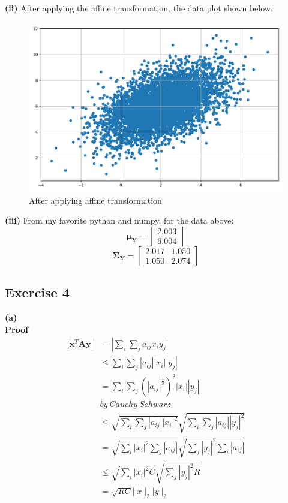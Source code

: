 \documentclass[11pt]{article}
\begin{document}
\textbf{(ii)} After applying the affine transformation, the data plot shown below.
\begin{figure}[h]
\centering
\includegraphics[width=0.45\linewidth]{exercise3_c2}
\caption{After applying affine transformation}
\label{fig: figure 3.3}
\end{figure}

\textbf{(iii)} From my favorite python and numpy, for the data above:
$$\pmb{\mu}_\textbf{Y}=\begin{bmatrix}
2.003\\
6.004
\end{bmatrix}$$
$$\pmb{\Sigma}_\textbf{Y}=\begin{bmatrix}
2.017& 1.050\\
1.050& 2.074
\end{bmatrix}$$
\pagebreak
\subsection*{Exercise 4}
\noindent\textbf{(a)}\\
\textbf{Proof}
\begin{equation} \label{4.a}
\begin{split}
\left|\textbf{x}^T\textbf{Ay}\right|&=\left|\sum_{i}\sum_{j}a_{ij}x_iy_j\right|\\
&\le\sum_i\sum_j\left|a_{ij}\right|\left|x_i\right|\left|y_j\right|\\
&=\sum_i\sum_j(\left|a_{ij}\right|^\frac{1}{2})^2\left|x_i\right|\left|y_j\right|\\
&by\ Cauchy\ Schwarz\\
&\le\sqrt{\sum_i\sum_j\left|a_{ij}\right|\left|x_i\right|^2}\sqrt{\sum_i\sum_j\left|a_{ij}\right|\left|y_j\right|^2}\\
&=\sqrt{\sum_i\left|x_i\right|^2\sum_j\left|a_{ij}\right|}\sqrt{\sum_j\left|y_j\right|^2\sum_i\left|a_{ij}\right|}\\
&\le\sqrt{\sum_i\left|x_i\right|^2C}\sqrt{\sum_j\left|y_j\right|^2R}\\
&=\sqrt{RC}||x||_2||y||_2\\
\end{split}
\end{equation}
\end{document}
